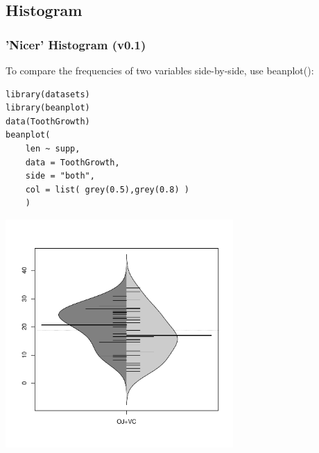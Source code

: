 \subsection{Histogram}
\begin{frame}
\frametitle{'Nicer' Histogram (v0.1)}

To compare the frequencies of two variables side-by-side, use \ttfamily beanplot(): \normalfont

	\begin{lstlisting}
library(datasets)
library(beanplot)
data(ToothGrowth)
beanplot(
	len ~ supp, 
	data = ToothGrowth, 
	side = "both", 
	col = list( grey(0.5),grey(0.8) )
	)
	\end{lstlisting}

        \begin{center}
	         \includegraphics[width=0.65\textwidth]{images/beanplot_v0.pdf}
        \end{center}

\end{frame}

